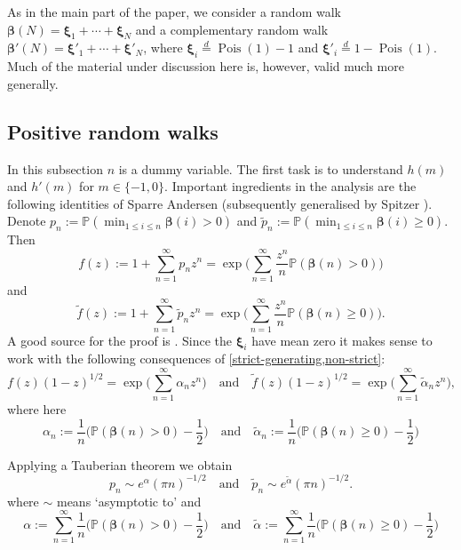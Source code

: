 \documentclass[11pt,reqno]{amsart}
\numberwithin{equation}{section}
\theoremstyle{definition}
\theoremstyle{remark}
\newcommand{\mb}{\mathbb}
\newcommand\Pois{\operatorname{Pois}}
\def\boldbeta{\boldsymbol\beta}
\def\boldxi{\boldsymbol\xi}
\renewcommand{\le}{\leqslant}
\renewcommand{\ge}{\geqslant}
\newcommand\samedist{\overset{d}{=}}
\begin{document}
As in the main part of the paper, we consider a random walk $\boldbeta(N) = \boldxi_1 + \cdots + \boldxi_N$ and a complementary random walk $\boldbeta'(N) = \boldxi'_1 + \cdots + \boldxi'_N$, where $\boldxi_i \samedist \Pois(1) - 1$ and $\boldxi'_i \samedist 1 - \Pois(1)$. Much of the material under discussion here is, however, valid much more generally.


\subsection{Positive random walks} \label{a1-sec} In this subsection $n$ is a dummy variable. The first task is to understand $h(m)$ and $h'(m)$ for $m \in \{-1,0\}$.  Important ingredients in the analysis are the following identities of Sparre Andersen \cite{sparre-andersen} (subsequently generalised by Spitzer \cite{spitzer}). Denote $p_n := \mb{P}(\min_{1 \le i \le n} \boldbeta(i) > 0)$ and $\tilde{p}_n := \mb{P}(\min_{1 \le i \le n} \boldbeta(i) \ge 0)$. Then 
\begin{equation}\label{strict-generating} f(z) := 1 + \sum_{n = 1}^{\infty} p_n z^n = \exp \big( \sum_{n = 1}^{\infty} \frac{z^n}{n} \mb{P}(\boldbeta(n) > 0)\big)\end{equation} and
\begin{equation}\label{non-strict} \tilde{f}(z) := 1 + \sum_{n = 1}^{\infty} \tilde{p}_n z^n = \exp \big( \sum_{n = 1}^{\infty} \frac{z^n}{n} \mb{P}(\boldbeta(n) \ge 0)\big).\end{equation}
A good source for the proof is \cite[XII. 7]{feller2}. Since the $\boldxi_i$ have mean zero it makes sense to work with the following consequences of \cref{strict-generating,non-strict}: 
\[ f(z) (1- z)^{1/2}  = \exp \big( \sum_{n = 1}^{\infty} \alpha_n z^n  \big) \quad \mbox{and} \quad \tilde{f}(z)(1 - z)^{1/2} = \exp \big( \sum_{n = 1}^{\infty} \tilde{\alpha}_n z^n\big),\]
where here
\[ \alpha_n := \frac{1}{n} \big( \mb{P} (\boldbeta(n) > 0) - \frac{1}{2}\big)\quad \mbox{and} \quad \tilde\alpha_n := \frac{1}{n} \big( \mb{P} (\boldbeta(n) \ge 0) - \frac{1}{2}\big) \]

Applying a Tauberian theorem \cite[XII. 8, Theorem 1a]{feller2} we obtain
\begin{equation}\label{asymptotics} p_n \sim e^{\alpha} (\pi n)^{-1/2} \quad \mbox{and} \quad  \tilde{p}_n \sim e^{\tilde \alpha} (\pi n)^{-1/2}.\end{equation} where $\sim$ means `asymptotic to' and
\begin{equation}\label{alpha-defs} \alpha := \sum_{n = 1}^{\infty} \frac{1}{n} \big( \mb{P}(\boldbeta(n) > 0) - \frac{1}{2} \big) \quad \mbox{and} \quad  \tilde{\alpha} := \sum_{n = 1}^{\infty}\frac{1}{n} \big( \mb{P}(\boldbeta(n) \ge  0) - \frac{1}{2} \big)\end{equation} 
\end{document}

